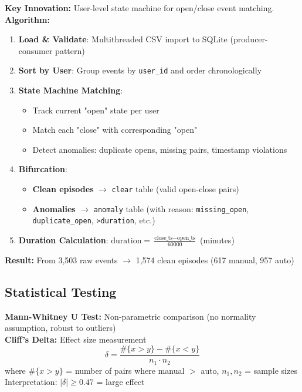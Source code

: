 \documentclass[11pt,a4paper]{article}
\begin{document}
\textbf{Key Innovation:} User-level state machine for open/close event matching.
\\
\textbf{Algorithm:}
\begin{enumerate}
    \item \textbf{Load \& Validate}: Multithreaded CSV import to SQLite (producer-consumer pattern)
    \item \textbf{Sort by User}: Group events by \texttt{user\_id} and order chronologically
    \item \textbf{State Machine Matching}:
    \begin{itemize}
        \item Track current "open" state per user
        \item Match each "close" with corresponding "open"
        \item Detect anomalies: duplicate opens, missing pairs, timestamp violations
    \end{itemize}
    \item \textbf{Bifurcation}:
    \begin{itemize}
        \item \textbf{Clean episodes} $\rightarrow$ \texttt{clear} table (valid open-close pairs)
        \item \textbf{Anomalies} $\rightarrow$ \texttt{anomaly} table (with reason: \texttt{missing\_open}, \texttt{duplicate\_open}, \texttt{>duration}, etc.)
    \end{itemize}
    \item \textbf{Duration Calculation}: $\text{duration} = \frac{\text{close\_ts} - \text{open\_ts}}{60000}$ (minutes)
\end{enumerate}

\textbf{Result:} From 3,503 raw events $\rightarrow$ 1,574 clean episodes (617 manual, 957 auto)

\subsection{Statistical Testing}

\textbf{Mann-Whitney U Test:} Non-parametric comparison (no normality assumption, robust to outliers)
\\
\textbf{Cliff's Delta:} Effect size measurement
\[
\delta = \frac{\text{\#}\{x > y\} - \text{\#}\{x < y\}}{n_1 \cdot n_2}
\]
where $\text{\#}\{x > y\}$ = number of pairs where manual $>$ auto, $n_1, n_2$ = sample sizes
\\
Interpretation: $|\delta| \geq 0.47$ = large effect
\end{document}
